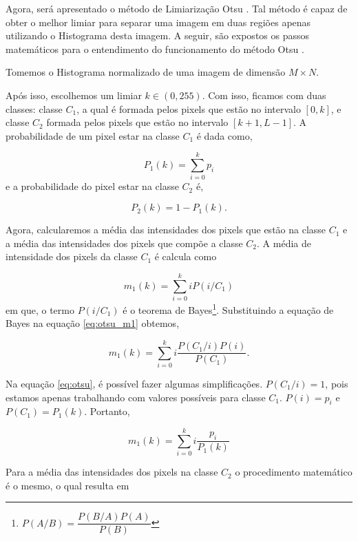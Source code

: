 Agora, será apresentado o método de Limiarização Otsu \cite{otsu1979threshold}. Tal método é capaz de obter o melhor limiar para separar uma imagem em duas regiões apenas utilizando o Histograma desta imagem. A seguir, são expostos os passos matemáticos para o entendimento do funcionamento do método Otsu \cite{gonzalezprocessamento}. 

Tomemos o Histograma normalizado de uma imagem de dimensão $M \times N$. 

Após isso, escolhemos um limiar $k \in (0,255)$. Com isso, ficamos com duas classes: classe $C_1$, a qual é formada pelos pixels que estão no intervalo $[0,k]$, e classe $C_2$ formada pelos pixels que estão no intervalo $[k+1, L-1]$. A probabilidade de um pixel estar na classe $C_1$ é dada como,

\begin{equation}
	P_1(k) = \sum_{i=0}^{k} p_i
\end{equation}
e a probabilidade do pixel estar na classe $C_2$ é,

\begin{equation}
	P_2(k) = 1 - P_1(k).
\end{equation}

Agora, calcularemos a média das intensidades dos pixels que estão na classe $C_1$ e a média das intensidades dos pixels que compõe a classe $C_2$. A média de intensidade dos pixels da classe $C_1$ é calcula como 

\begin{equation}
	m_1(k) = \sum_{i=0}^{k} iP(i/C_1)
	\label{eq:otsu_m1}
\end{equation}
em que, o termo $P(i/C_1)$ é o teorema de Bayes\footnote{$P(A/B) = \dfrac{P(B/A)P(A)}{P(B)}$}. Substituindo a equação de Bayes na equação \ref{eq:otsu_m1} obtemos, 

\begin{equation}
	m_1(k) = \sum_{i=0}^{k} i \frac{P(C_1/i)P(i)}{P(C_1)}.
	\label{eq:otsu}
\end{equation}

Na equação \ref{eq:otsu}, é possível fazer algumas simplificações. $P(C_1/i) = 1$, pois estamos apenas trabalhando com valores possíveis para classe $C_1$. $P(i) = p_i$ e $P(C_1) = P_1(k)$. Portanto,

\begin{equation}
	m_1(k) = \sum_{i=0}^{k} i \frac{p_i}{P_1(k)}
	\label{eq:otsu_1}
\end{equation}

Para a média das intensidades dos pixels na classe $C_2$ o procedimento matemático é o mesmo, o qual resulta em  

